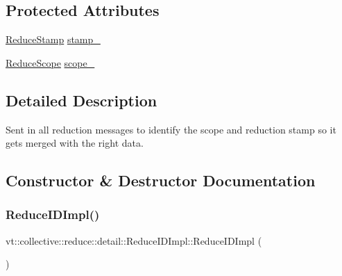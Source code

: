 \subsection*{Protected Attributes}
\begin{DoxyCompactItemize}
\item 
\hyperlink{namespacevt_1_1collective_1_1reduce_1_1detail_aacc1fcd729d934ba143fee3a943bf9e7}{Reduce\+Stamp} \hyperlink{structvt_1_1collective_1_1reduce_1_1detail_1_1_reduce_i_d_impl_a84804f019298c0321847c09749ced0bb}{stamp\+\_\+}
\item 
\hyperlink{structvt_1_1collective_1_1reduce_1_1detail_1_1_reduce_scope}{Reduce\+Scope} \hyperlink{structvt_1_1collective_1_1reduce_1_1detail_1_1_reduce_i_d_impl_afc9cc556d4e84fe7c41944102a926d59}{scope\+\_\+}
\end{DoxyCompactItemize}


\subsection{Detailed Description}
Sent in all reduction messages to identify the scope and reduction stamp so it gets merged with the right data. 



\subsection{Constructor \& Destructor Documentation}
\mbox{\label{structvt_1_1collective_1_1reduce_1_1detail_1_1_reduce_i_d_impl_a02838391cc76625466de53c8197baead}} 
\subsubsection{\texorpdfstring{Reduce\+I\+D\+Impl()}{ReduceIDImpl()}\hspace{0.1cm}{\footnotesize\ttfamily [1/4]}}
{\footnotesize\ttfamily vt\+::collective\+::reduce\+::detail\+::\+Reduce\+I\+D\+Impl\+::\+Reduce\+I\+D\+Impl (\begin{DoxyParamCaption}{ }\end{DoxyParamCaption})\hspace{0.3cm}{\ttfamily [default]}}

